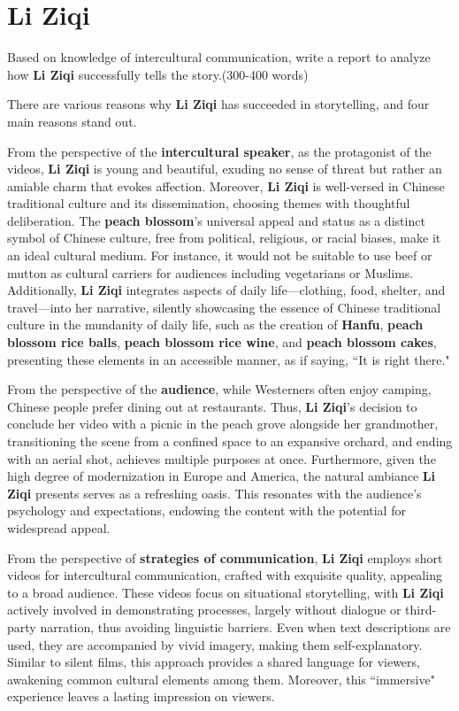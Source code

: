 \section{Li Ziqi}

\begin{question}{}{}
    Based on knowledge of intercultural communication, write a report to analyze how \textbf{Li Ziqi} successfully tells the story.(300-400 words)
\end{question}

There are various reasons why \textbf{Li Ziqi} has succeeded in storytelling, and four main reasons stand out.

From the perspective of the \textbf{intercultural speaker}, as the protagonist of the videos, \textbf{Li Ziqi} is young and beautiful, exuding no sense of threat but rather an amiable charm that evokes affection. Moreover, \textbf{Li Ziqi} is well-versed in Chinese traditional culture and its dissemination, choosing themes with thoughtful deliberation. The \textbf{peach blossom}'s universal appeal and status as a distinct symbol of Chinese culture, free from political, religious, or racial biases, make it an ideal cultural medium. For instance, it would not be suitable to use beef or mutton as cultural carriers for audiences including vegetarians or Muslims. Additionally, \textbf{Li Ziqi} integrates aspects of daily life—clothing, food, shelter, and travel—into her narrative, silently showcasing the essence of Chinese traditional culture in the mundanity of daily life, such as the creation of \textbf{Hanfu}, \textbf{peach blossom rice balls}, \textbf{peach blossom rice wine}, and \textbf{peach blossom cakes}, presenting these elements in an accessible manner, as if saying, ``It is right there."

From the perspective of the \textbf{audience}, while Westerners often enjoy camping, Chinese people prefer dining out at restaurants. Thus, \textbf{Li Ziqi}'s decision to conclude her video with a picnic in the peach grove alongside her grandmother, transitioning the scene from a confined space to an expansive orchard, and ending with an aerial shot, achieves multiple purposes at once. Furthermore, given the high degree of modernization in Europe and America, the natural ambiance \textbf{Li Ziqi} presents serves as a refreshing oasis. This resonates with the audience’s psychology and expectations, endowing the content with the potential for widespread appeal.

From the perspective of \textbf{strategies of communication}, \textbf{Li Ziqi} employs short videos for intercultural communication, crafted with exquisite quality, appealing to a broad audience. These videos focus on situational storytelling, with \textbf{Li Ziqi} actively involved in demonstrating processes, largely without dialogue or third-party narration, thus avoiding linguistic barriers. Even when text descriptions are used, they are accompanied by vivid imagery, making them self-explanatory. Similar to silent films, this approach provides a shared language for viewers, awakening common cultural elements among them. Moreover, this ``immersive" experience leaves a lasting impression on viewers.

